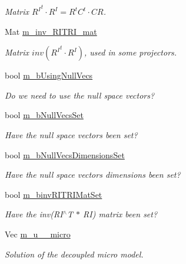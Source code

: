 \begin{DoxyCompactItemize}
\begin{DoxyCompactList}\small\item\em Matrix ${R^I}^t \cdot R^I = R^t C^t \cdot C R $. \end{DoxyCompactList}\item 
Mat \hyperlink{classcarl_1_1_f_e_t_i___operations_a5b61754f3ea2e4c674fd37f18ec0014b}{m\+\_\+inv\+\_\+\+R\+I\+T\+R\+I\+\_\+mat}
\begin{DoxyCompactList}\small\item\em Matrix $ inv({R^I}^t \cdot R^I)$, used in some projectors. \end{DoxyCompactList}\item 
bool \hyperlink{classcarl_1_1_f_e_t_i___operations_aff68699ccceb6e1debc4ecab97dde2ff}{m\+\_\+b\+Using\+Null\+Vecs}
\begin{DoxyCompactList}\small\item\em Do we need to use the null space vectors? \end{DoxyCompactList}\item 
bool \hyperlink{classcarl_1_1_f_e_t_i___operations_a96f6ef39dd083e2f659cc0be7e35ff19}{m\+\_\+b\+Null\+Vecs\+Set}
\begin{DoxyCompactList}\small\item\em Have the null space vectors been set? \end{DoxyCompactList}\item 
bool \hyperlink{classcarl_1_1_f_e_t_i___operations_afd921550a2e18db731f244ea40688477}{m\+\_\+b\+Null\+Vecs\+Dimensions\+Set}
\begin{DoxyCompactList}\small\item\em Have the null space vectors\textquotesingle{} dimensions been set? \end{DoxyCompactList}\item 
bool \hyperlink{classcarl_1_1_f_e_t_i___operations_a259bd691984bbbaa20dcf151adc9bc78}{m\+\_\+binv\+R\+I\+T\+R\+I\+Mat\+Set}
\begin{DoxyCompactList}\small\item\em Have the inv(\+R\+I$^\wedge$\+T $\ast$ R\+I) matrix been set? \end{DoxyCompactList}\item 
Vec \hyperlink{classcarl_1_1_f_e_t_i___operations_a24aa345060f6ae75b71ce2071aa3a093}{m\+\_\+u\+\_\+\_\+micro}
\begin{DoxyCompactList}\small\item\em Solution of the decoupled micro model. \end{DoxyCompactList}\item 

\end{DoxyCompactItemize}
